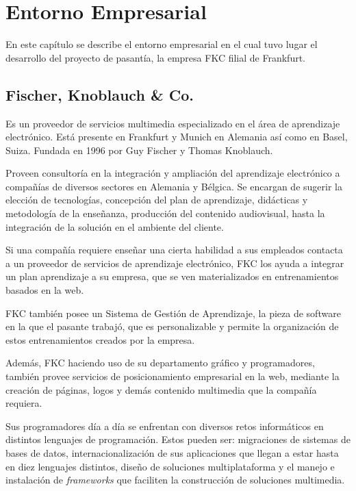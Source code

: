 \chapter{Entorno Empresarial}
\thispagestyle{empty} %

En este capítulo se describe el entorno empresarial en el cual tuvo lugar el desarrollo del proyecto de pasantía, la empresa \gls{FKC} filial de Frankfurt.

\section{Fischer, Knoblauch \& Co.}

Es un proveedor de servicios multimedia especializado en el área de aprendizaje electrónico. Está presente en Frankfurt y Munich en Alemania así como en Basel, Suiza. Fundada en 1996 por Guy Fischer y Thomas Knoblauch.

Proveen consultoría en la integración y ampliación del aprendizaje electrónico a compañías de diversos sectores en Alemania y Bélgica. Se encargan de sugerir la elección de tecnologías, concepción del plan de aprendizaje, didácticas y metodología de la enseñanza, producción del contenido audiovisual, hasta la integración de la solución en el ambiente del cliente. 

Si una compañía requiere enseñar una cierta habilidad a sus empleados contacta a un proveedor de servicios de aprendizaje electrónico, \gls{FKC} los ayuda a integrar un plan aprendizaje a su empresa, que se ven materializados en entrenamientos basados en la web. 

\gls{FKC} también posee un Sistema de Gestión de Aprendizaje, la pieza de software en la que el pasante trabajó, que es personalizable y permite la organización de estos entrenamientos creados por la empresa.

Además, \gls{FKC} haciendo uso de su departamento gráfico y programadores, también provee servicios de posicionamiento empresarial en la web, mediante la creación de páginas, logos y demás contenido multimedia que la compañía requiera. 

Sus programadores día a día se enfrentan con diversos retos informáticos en distintos lenguajes de programación. Estos pueden ser: migraciones de sistemas de bases de datos, internacionalización de sus aplicaciones que llegan a estar hasta en diez lenguajes distintos, diseño de soluciones multiplataforma y el manejo e instalación de \emph{frameworks} que faciliten la construcción de soluciones multimedia.

